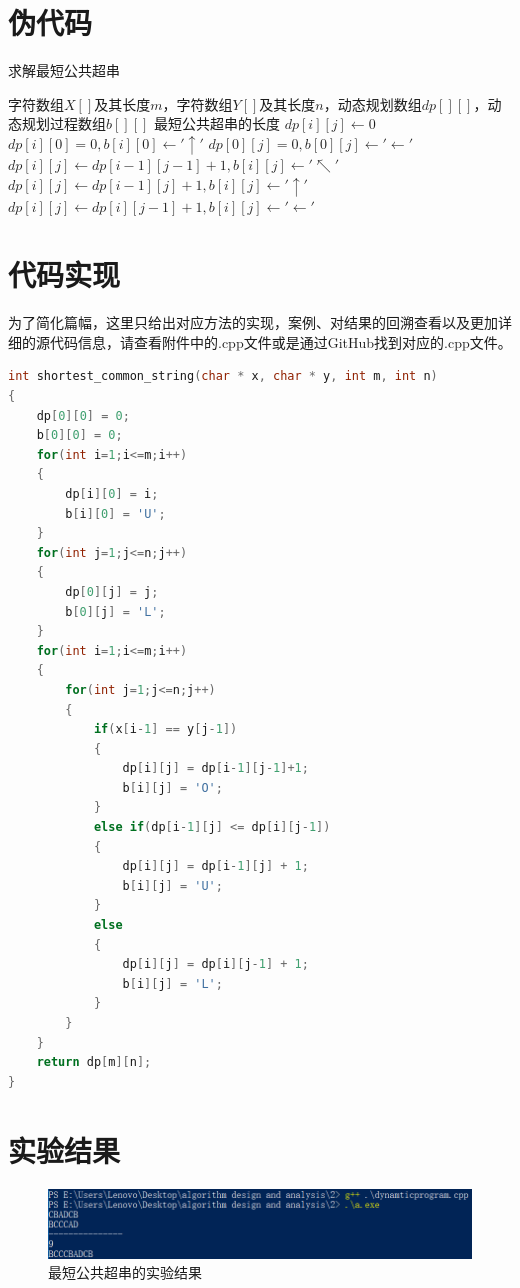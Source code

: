 \documentclass[11pt]{ctexart}
\begin{document}
\section{伪代码}
\begin{algorithm}[H]
\caption{求解最短公共超串}
\begin{algorithmic}[1] %
\Require 字符数组$X[]$及其长度$m$，字符数组$Y[]$及其长度$n$，动态规划数组$dp[][]$，动态规划过程数组$b[][]$
\Ensure 最短公共超串的长度
\State $dp[i][j] \gets 0$
    \State $dp[i][0]=0,b[i][0]\gets '\uparrow'$
\EndFor
{}
    \State $dp[0][j]=0,b[0][j]\gets '\leftarrow'$
\EndFor
{}
            \State $dp[i][j] \gets dp[i-1][j-1]+1, b[i][j] \gets '\nwarrow'$
            \State $dp[i][j] \gets dp[i-1][j]+1, b[i][j] \gets '\uparrow'$
        \Else
            \State $dp[i][j] \gets dp[i][j-1]+1, b[i][j] \gets '\leftarrow'$
        \EndIf
    \EndFor
\EndFor
{}
\EndFunction
\end{algorithmic}
\end{algorithm}

\section{代码实现}
为了简化篇幅，这里只给出对应方法的实现，案例、对结果的回溯查看以及更加详细的源代码信息，请查看附件中的.cpp文件或是通过GitHub找到对应的.cpp文件。
\begin{lstlisting}[language=C++]
int shortest_common_string(char * x, char * y, int m, int n)
{
	dp[0][0] = 0;
	b[0][0] = 0;
	for(int i=1;i<=m;i++)
	{
		dp[i][0] = i;
		b[i][0] = 'U';
	}
	for(int j=1;j<=n;j++)
	{
		dp[0][j] = j;
		b[0][j] = 'L';
	}
	for(int i=1;i<=m;i++)
	{
		for(int j=1;j<=n;j++)
		{
			if(x[i-1] == y[j-1])
			{
				dp[i][j] = dp[i-1][j-1]+1;
				b[i][j] = 'O';
			}
			else if(dp[i-1][j] <= dp[i][j-1])
			{
				dp[i][j] = dp[i-1][j] + 1;
				b[i][j] = 'U';
			}
			else
			{
				dp[i][j] = dp[i][j-1] + 1;
				b[i][j] = 'L';
			}
		}
	}
	return dp[m][n];
}
\end{lstlisting}

\section{实验结果}
\begin{figure}[H]
\centering
\includegraphics[scale=0.9]{dynamticprogram.png}
\caption{最短公共超串的实验结果}
\end{figure}
\end{document}
